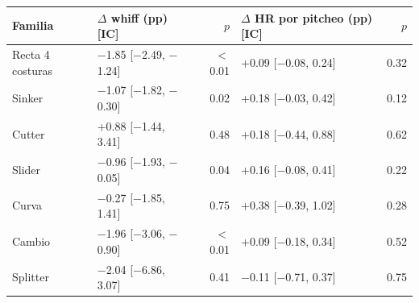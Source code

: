 \begin{tabular}{llrlr}
\toprule
Familia & $\Delta$ whiff (pp) [IC] & $p$ & $\Delta$ HR por pitcheo (pp) [IC] & $p$ \\
\midrule
Recta 4 costuras & \ensuremath{-}1.85 [\ensuremath{-}2.49, \ensuremath{-}1.24] & \ensuremath{<}0.01 & +0.09 [\ensuremath{-}0.08, 0.24] & 0.32 \\
Sinker & \ensuremath{-}1.07 [\ensuremath{-}1.82, \ensuremath{-}0.30] & 0.02 & +0.18 [\ensuremath{-}0.03, 0.42] & 0.12 \\
Cutter & +0.88 [\ensuremath{-}1.44, 3.41] & 0.48 & +0.18 [\ensuremath{-}0.44, 0.88] & 0.62 \\
Slider & \ensuremath{-}0.96 [\ensuremath{-}1.93, \ensuremath{-}0.05] & 0.04 & +0.16 [\ensuremath{-}0.08, 0.41] & 0.22 \\
Curva & \ensuremath{-}0.27 [\ensuremath{-}1.85, 1.41] & 0.75 & +0.38 [\ensuremath{-}0.39, 1.02] & 0.28 \\
Cambio & \ensuremath{-}1.96 [\ensuremath{-}3.06, \ensuremath{-}0.90] & \ensuremath{<}0.01 & +0.09 [\ensuremath{-}0.18, 0.34] & 0.52 \\
Splitter & \ensuremath{-}2.04 [\ensuremath{-}6.86, 3.07] & 0.41 & \ensuremath{-}0.11 [\ensuremath{-}0.71, 0.37] & 0.75 \\
\bottomrule
\end{tabular}
